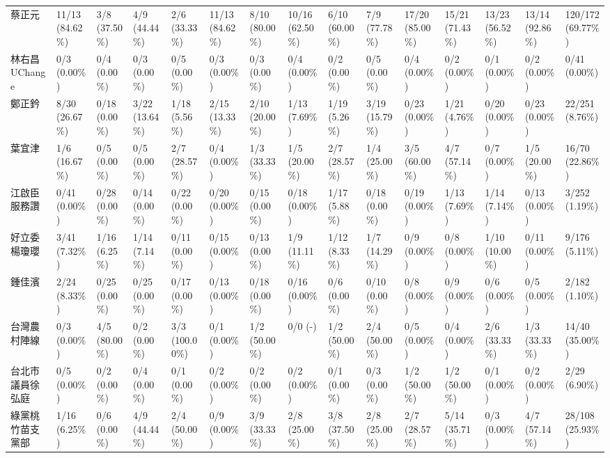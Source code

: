 \documentclass[letterpaper, 10pt, conference]{ieeeconf}   %
\begin{document}
\begin{CJK}{UTF8}{bsmi}
\begin{landscape}
\begin{longtable}[c]{@{}L{2.45cm}L{1.1cm}L{1.1cm}L{1.1cm}L{1.1cm}L{1.1cm}L{1.1cm}L{1.1cm}L{1.1cm}L{1.1cm}L{1.1cm}L{1.1cm}L{1.1cm}L{1.1cm}L{1.1cm}@{}}
蔡正元 & 11/13 (84.62\%) & 3/8 (37.50\%) & 4/9 (44.44\%) & 2/6 (33.33\%) & 11/13 (84.62\%) & 8/10 (80.00\%) & 10/16 (62.50\%) & 6/10 (60.00\%) & 7/9 (77.78\%) & 17/20 (85.00\%) & 15/21 (71.43\%) & 13/23 (56.52\%) & 13/14 (92.86\%) & 120/172 (69.77\%) \\
林右昌UChange & 0/3 (0.00\%) & 0/4 (0.00\%) & 0/3 (0.00\%) & 0/5 (0.00\%) & 0/3 (0.00\%) & 0/3 (0.00\%) & 0/4 (0.00\%) & 0/2 (0.00\%) & 0/5 (0.00\%) & 0/4 (0.00\%) & 0/2 (0.00\%) & 0/1 (0.00\%) & 0/2 (0.00\%) & 0/41 (0.00\%) \\
鄭正鈐 & 8/30 (26.67\%) & 0/18 (0.00\%) & 3/22 (13.64\%) & 1/18 (5.56\%) & 2/15 (13.33\%) & 2/10 (20.00\%) & 1/13 (7.69\%) & 1/19 (5.26\%) & 3/19 (15.79\%) & 0/23 (0.00\%) & 1/21 (4.76\%) & 0/20 (0.00\%) & 0/23 (0.00\%) & 22/251 (8.76\%) \\
葉宜津 & 1/6 (16.67\%) & 0/5 (0.00\%) & 0/5 (0.00\%) & 2/7 (28.57\%) & 0/4 (0.00\%) & 1/3 (33.33\%) & 1/5 (20.00\%) & 2/7 (28.57\%) & 1/4 (25.00\%) & 3/5 (60.00\%) & 4/7 (57.14\%) & 0/7 (0.00\%) & 1/5 (20.00\%) & 16/70 (22.86\%) \\
江啟臣服務讚 & 0/41 (0.00\%) & 0/28 (0.00\%) & 0/14 (0.00\%) & 0/22 (0.00\%) & 0/20 (0.00\%) & 0/15 (0.00\%) & 0/18 (0.00\%) & 1/17 (5.88\%) & 0/18 (0.00\%) & 0/19 (0.00\%) & 1/13 (7.69\%) & 1/14 (7.14\%) & 0/13 (0.00\%) & 3/252 (1.19\%) \\
好立委 楊瓊瓔 & 3/41 (7.32\%) & 1/16 (6.25\%) & 1/14 (7.14\%) & 0/11 (0.00\%) & 0/15 (0.00\%) & 0/13 (0.00\%) & 1/9 (11.11\%) & 1/12 (8.33\%) & 1/7 (14.29\%) & 0/9 (0.00\%) & 0/8 (0.00\%) & 1/10 (10.00\%) & 0/11 (0.00\%) & 9/176 (5.11\%) \\
鍾佳濱 & 2/24 (8.33\%) & 0/25 (0.00\%) & 0/25 (0.00\%) & 0/17 (0.00\%) & 0/13 (0.00\%) & 0/18 (0.00\%) & 0/16 (0.00\%) & 0/6 (0.00\%) & 0/10 (0.00\%) & 0/8 (0.00\%) & 0/9 (0.00\%) & 0/6 (0.00\%) & 0/5 (0.00\%) & 2/182 (1.10\%) \\
台灣農村陣線 & 0/3 (0.00\%) & 4/5 (80.00\%) & 0/2 (0.00\%) & 3/3 (100.00\%) & 0/1 (0.00\%) & 1/2 (50.00\%) & 0/0 (-) & 1/2 (50.00\%) & 2/4 (50.00\%) & 0/5 (0.00\%) & 0/4 (0.00\%) & 2/6 (33.33\%) & 1/3 (33.33\%) & 14/40 (35.00\%) \\
台北市議員徐弘庭 & 0/5 (0.00\%) & 0/2 (0.00\%) & 0/4 (0.00\%) & 0/1 (0.00\%) & 0/2 (0.00\%) & 0/2 (0.00\%) & 0/2 (0.00\%) & 0/1 (0.00\%) & 0/3 (0.00\%) & 1/2 (50.00\%) & 1/2 (50.00\%) & 0/1 (0.00\%) & 0/2 (0.00\%) & 2/29 (6.90\%) \\
綠黨桃竹苗支黨部 & 1/16 (6.25\%) & 0/6 (0.00\%) & 4/9 (44.44\%) & 2/4 (50.00\%) & 0/9 (0.00\%) & 3/9 (33.33\%) & 2/8 (25.00\%) & 3/8 (37.50\%) & 2/8 (25.00\%) & 2/7 (28.57\%) & 5/14 (35.71\%) & 0/3 (0.00\%) & 4/7 (57.14\%) & 28/108 (25.93\%) \\

\end{longtable}
\end{landscape}
\end{CJK}
\end{document}
